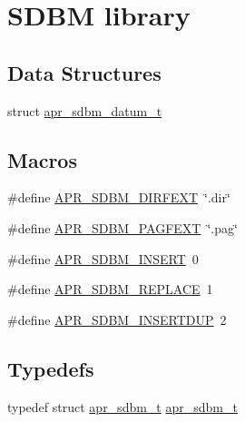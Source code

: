 \hypertarget{group___a_p_r___util___d_b_m___s_d_b_m}{\section{S\-D\-B\-M library}
\label{group___a_p_r___util___d_b_m___s_d_b_m}
}
\subsection*{Data Structures}
\begin{DoxyCompactItemize}
\item 
struct \hyperlink{structapr__sdbm__datum__t}{apr\-\_\-sdbm\-\_\-datum\-\_\-t}
\end{DoxyCompactItemize}
\subsection*{Macros}
\begin{DoxyCompactItemize}
\item 
\#define \hyperlink{group___a_p_r___util___d_b_m___s_d_b_m_gafabaf97932efa0eebfb1cc6b692a111f}{A\-P\-R\-\_\-\-S\-D\-B\-M\-\_\-\-D\-I\-R\-F\-E\-X\-T}~\char`\"{}.dir\char`\"{}
\item 
\#define \hyperlink{group___a_p_r___util___d_b_m___s_d_b_m_gaa03fa1d1183240ca0845c54cc07df557}{A\-P\-R\-\_\-\-S\-D\-B\-M\-\_\-\-P\-A\-G\-F\-E\-X\-T}~\char`\"{}.pag\char`\"{}
\item 
\#define \hyperlink{group___a_p_r___util___d_b_m___s_d_b_m_gad42d896bab08b5e210f489fa59656807}{A\-P\-R\-\_\-\-S\-D\-B\-M\-\_\-\-I\-N\-S\-E\-R\-T}~0
\item 
\#define \hyperlink{group___a_p_r___util___d_b_m___s_d_b_m_ga84e2252c9ddf5e6c64ed1be43d2d0e53}{A\-P\-R\-\_\-\-S\-D\-B\-M\-\_\-\-R\-E\-P\-L\-A\-C\-E}~1
\item 
\#define \hyperlink{group___a_p_r___util___d_b_m___s_d_b_m_ga64cd385609059cf151e54c7046d92ec3}{A\-P\-R\-\_\-\-S\-D\-B\-M\-\_\-\-I\-N\-S\-E\-R\-T\-D\-U\-P}~2
\end{DoxyCompactItemize}
\subsection*{Typedefs}
\begin{DoxyCompactItemize}
\item 
typedef struct \hyperlink{structapr__sdbm__t}{apr\-\_\-sdbm\-\_\-t} \hyperlink{group___a_p_r___util___d_b_m___s_d_b_m_gaf24cdea6e4884036a40484259efa68c6}{apr\-\_\-sdbm\-\_\-t}
\end{DoxyCompactItemize}
